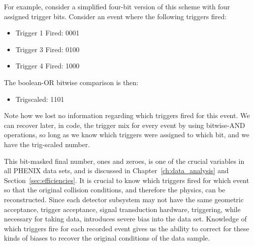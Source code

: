 For example, consider a simplified four-bit version of this scheme with four
assigned trigger bits. Consider an event where the following triggers fired:

\begin{itemize}
    \item Trigger 1 Fired: 0001
    \item Trigger 3 Fired: 0100
    \item Trigger 4 Fired: 1000
\end{itemize}

The boolean-OR bitwise comparison is then:

\begin{itemize}
  \item Trigscaled: 1101
\end{itemize}

Note how we lost no information regarding which triggers fired for this event.
We can recover later, in code, the trigger mix for every event by using
bitwise-AND operations, so long as we know which triggers were assigned to which
bit, and we have the trig-scaled number.

This bit-masked final number, ones and zeroes, is one of the crucial variables
in all PHENIX data sets, and is discussed in Chapter~\ref{ch:data_analysis} and
Section~\ref{sec:efficiencies}. It is crucial to know which triggers fired for
which event so that the original collision conditions, and therefore the
physics, can be reconstructed. Since each detector subsystem may not have the
same geometric acceptance, trigger acceptance, signal transduction hardware,
triggering, while necessary for taking data, introduces severe bias into the
data set. Knowledge of which triggers fire for each recorded event gives us the
ability to correct for these kinds of biases to recover the original conditions
of the data sample.
